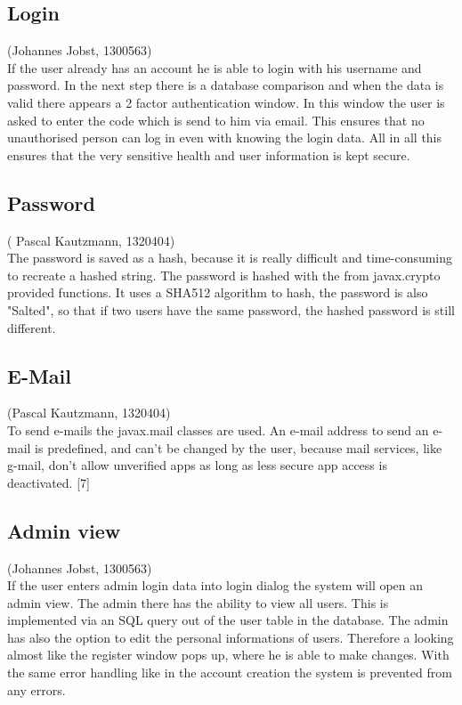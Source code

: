 \documentclass[a4paper, 12pt]{report}
\begin{document}
\subsection{Login}
{\tiny (Johannes Jobst, 1300563)\\}
If the user already has an account he is able to login with his username and password. In the next step there is a database comparison and when the data is valid there appears a 2 factor authentication window. In this window the user is asked to enter the code which is send to him via email. This ensures that no unauthorised person can log in even with knowing the login data. All in all this ensures that the very sensitive health and user information is kept secure.

\subsection{Password}
{\tiny ( Pascal Kautzmann, 1320404)\\}
The password is saved as a hash, because it is really difficult and time-consuming to recreate a hashed string.
The password is hashed with the from javax.crypto provided functions. It uses a SHA512 algorithm to hash, the password is also "Salted", so that if two users have the same password, the hashed password is still different.

\subsection{E-Mail}
{\tiny (Pascal Kautzmann, 1320404)\\}
To send e-mails the javax.mail classes are used. An e-mail address to send an e-mail is predefined, and can't be changed by the user,
because mail services, like g-mail, don't allow unverified apps as long as  less secure app access is deactivated. [7]


\subsection{Admin view}
{\tiny (Johannes Jobst, 1300563)\\}
If the user enters admin login data into login dialog the system will open an admin view. The admin there has the ability to view all users. This is implemented via an SQL query out of the user table in the database. The admin has also the option to edit the personal informations of users. Therefore a looking almost like the register window pops up, where he is able to make changes.
With the same error handling like in the account creation the system is prevented from any errors.
\end{document}
